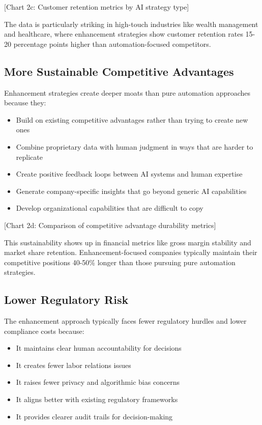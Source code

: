 \documentclass[
  Letterpaper,
]{scrbook}
\providecommand{\tightlist}{%
  \setlength{\itemsep}{0pt}\setlength{\parskip}{0pt}}\usepackage{longtable,booktabs,array}
\begin{document}
{[}Chart 2c: Customer retention metrics by AI strategy type{]}

The data is particularly striking in high-touch industries like wealth
management and healthcare, where enhancement strategies show customer
retention rates 15-20 percentage points higher than automation-focused
competitors.

\subsection{More Sustainable Competitive
Advantages}\label{more-sustainable-competitive-advantages}

Enhancement strategies create deeper moats than pure automation
approaches because they:

\begin{itemize}
\tightlist
\item
  Build on existing competitive advantages rather than trying to create
  new ones
\item
  Combine proprietary data with human judgment in ways that are harder
  to replicate
\item
  Create positive feedback loops between AI systems and human expertise
\item
  Generate company-specific insights that go beyond generic AI
  capabilities
\item
  Develop organizational capabilities that are difficult to copy
\end{itemize}

{[}Chart 2d: Comparison of competitive advantage durability metrics{]}

This sustainability shows up in financial metrics like gross margin
stability and market share retention. Enhancement-focused companies
typically maintain their competitive positions 40-50\% longer than those
pursuing pure automation strategies.

\subsection{Lower Regulatory Risk}\label{lower-regulatory-risk}

The enhancement approach typically faces fewer regulatory hurdles and
lower compliance costs because:

\begin{itemize}
\tightlist
\item
  It maintains clear human accountability for decisions
\item
  It creates fewer labor relations issues
\item
  It raises fewer privacy and algorithmic bias concerns
\item
  It aligns better with existing regulatory frameworks
\item
  It provides clearer audit trails for decision-making
\end{itemize}
\end{document}
